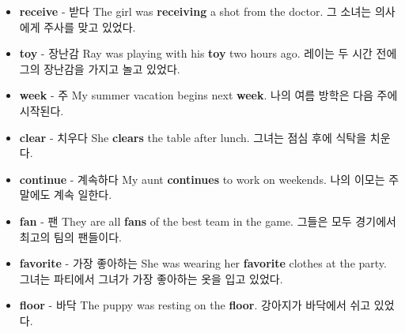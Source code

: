 \documentclass{article}
\begin{document}
\begin{addmargin}[1em]{1em}
\begin{itemize}
        \item \fontsize{12pt}{14pt}\selectfont \textbf{receive} - 받다 \newline
        The girl was \textbf{receiving} a shot from the doctor. \newline
        그 소녀는 의사에게 주사를 맞고 있었다.
        
        \item \fontsize{12pt}{14pt}\selectfont \textbf{toy} - 장난감 \newline
        Ray was playing with his \textbf{toy} two hours ago. \newline
        레이는 두 시간 전에 그의 장난감을 가지고 놀고 있었다.
        
        \item \fontsize{12pt}{14pt}\selectfont \textbf{week} - 주 \newline
        My summer vacation begins next \textbf{week}. \newline
        나의 여름 방학은 다음 주에 시작된다.
        
        \item \fontsize{12pt}{14pt}\selectfont \textbf{clear} - 치우다 \newline
        She \textbf{clears} the table after lunch. \newline
        그녀는 점심 후에 식탁을 치운다.
        
        \item \fontsize{12pt}{14pt}\selectfont \textbf{continue} - 계속하다 \newline
        My aunt \textbf{continues} to work on weekends. \newline
        나의 이모는 주말에도 계속 일한다.
        
        \item \fontsize{12pt}{14pt}\selectfont \textbf{fan} - 팬 \newline
        They are all \textbf{fans} of the best team in the game. \newline
        그들은 모두 경기에서 최고의 팀의 팬들이다.
        
        \item \fontsize{12pt}{14pt}\selectfont \textbf{favorite} - 가장 좋아하는 \newline
        She was wearing her \textbf{favorite} clothes at the party. \newline
        그녀는 파티에서 그녀가 가장 좋아하는 옷을 입고 있었다.
        
        \item \fontsize{12pt}{14pt}\selectfont \textbf{floor} - 바닥 \newline
        The puppy was resting on the \textbf{floor}. \newline
        강아지가 바닥에서 쉬고 있었다.
        

\end{itemize}
\end{addmargin}
\end{document}

